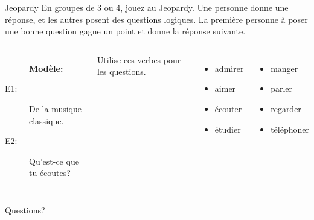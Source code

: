 \documentclass{beamer}
\begin{document}
  \begin{frame}{Jeopardy}
    \small
    En groupes de 3 ou 4, jouez au Jeopardy.
    Une personne donne une réponse, et les autres posent des questions logiques.
    La première personne à poser une bonne question gagne un point et donne la réponse suivante.
    \begin{columns}
        \begin{description}
          \item[] \textbf{Modèle:}
          \item[E1:] De la musique classique.
          \item[E2:] Qu'est-ce que tu écoutes?
        \end{description}
        \begin{center}
          Utilise ces verbes pour les questions.
        \end{center}
        \begin{columns}
            \begin{itemize}
              \item admirer
              \item aimer
              \item écouter
              \item étudier
            \end{itemize}
            \begin{itemize}
              \item manger
              \item parler
              \item regarder
              \item téléphoner
            \end{itemize}
        \end{columns}
    \end{columns}
  \end{frame}

  \begin{frame}{}
    \begin{center}
      \Large Questions?
    \end{center}
  \end{frame}
\end{document}
